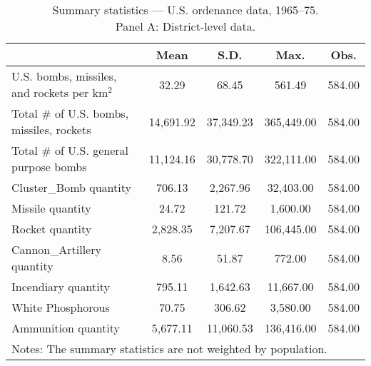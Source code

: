 \begin{table}[htbp]\centering
\def\sym#1{\ifmmode^{#1}\else\(^{#1}\)\fi}
\caption{Summary statistics — U.S. ordenance data, 1965–75. \\ Panel A: District-level data.}
\begin{tabular}{l*{1}{cccc}}
\toprule
                    &        Mean&        S.D.&        Max.&        Obs.\\
\midrule
U.S. bombs, missiles, and rockets per km$^2$&       32.29&       68.45&      561.49&      584.00\\
Total # of U.S. bombs, missiles, rockets&   14,691.92&   37,349.23&  365,449.00&      584.00\\
Total # of U.S. general purpose bombs&   11,124.16&   30,778.70&  322,111.00&      584.00\\
Cluster\_Bomb quantity&      706.13&    2,267.96&   32,403.00&      584.00\\
Missile quantity    &       24.72&      121.72&    1,600.00&      584.00\\
Rocket quantity     &    2,828.35&    7,207.67&  106,445.00&      584.00\\
Cannon\_Artillery quantity&        8.56&       51.87&      772.00&      584.00\\
Incendiary quantity &      795.11&    1,642.63&   11,667.00&      584.00\\
White Phosphorous   &       70.75&      306.62&    3,580.00&      584.00\\
Ammunition quantity &    5,677.11&   11,060.53&  136,416.00&      584.00\\
\bottomrule
\multicolumn{5}{l}{\footnotesize Notes: The summary statistics are not weighted by population.}\\
\end{tabular}
\end{table}
